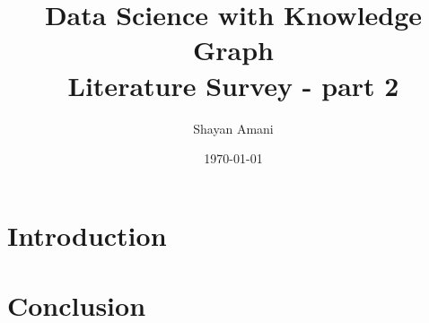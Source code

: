 \documentclass[letterpaper,12pt]{article}
\title{Data Science with Knowledge Graph \\{\large Literature Survey - part 2}}
\author{Shayan Amani}
\date{\today}
\begin{document}
\maketitle

\section{Introduction}




\section{Conclusion}




\end{document}

